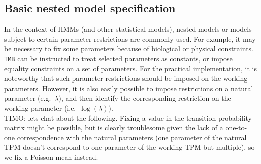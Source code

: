\documentclass[bimj,fleqn]{w-art}\usepackage[]{graphicx}\usepackage[]{color}
\theoremstyle{plain}
\theoremstyle{definition}
\begin{document}
\subsection{Basic nested model specification}
\label{sec:nested}

In the context of HMMs (and other statistical models), nested  models or models subject to certain parameter restrictions are commonly used. For example, it may be necessary to fix some parameters because of biological or physical constraints.  {\tt{TMB}} can be instructed to treat selected parameters as constants, or impose equality constraints on a set of parameters.
For the practical implementation, it is noteworthy that such parameter restrictions should be imposed on the working parameters.
However, it is also easily possible to impose restrictions on a natural parameter (e.g.~$\lambda$), and then identify the corresponding restriction on the working parameter (i.e.~$\log(\lambda)$).\\
TIMO: lets chat about the following. Fixing a value in the transition probability matrix might be possible, but is clearly troublesome given the lack of a one-to-one correspondence with the natural parameters (one parameter of the natural TPM doesn't correspond to one parameter of the working TPM but multiple), so we fix a Poisson mean instead.
\end{document}

